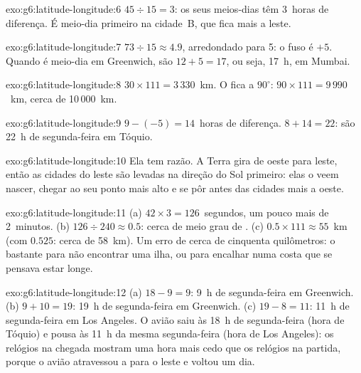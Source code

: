 \begin{solution}{exo:g6:latitude-longitude:6}
$45 \div 15 = 3$: os seus meios-dias têm 3~horas de diferença. É meio-dia
primeiro na cidade~B, que fica mais a leste.
\end{solution}

\begin{solution}{exo:g6:latitude-longitude:7}
$73 \div 15 \approx 4.9$, arredondado para 5: o fuso é $+5$. Quando é
meio-dia em Greenwich, são $12 + 5 = 17$, ou seja, 17~h, em Mumbai.
\end{solution}

\begin{solution}{exo:g6:latitude-longitude:8}
$30 \times 111 = 3\,330$~km. O  fica a $90^\circ$:
$90 \times 111 = 9\,990$~km, cerca de 10\,000~km.
\end{solution}

\begin{solution}{exo:g6:latitude-longitude:9}
$9 - (-5) = 14$~horas de diferença. $8 + 14 = 22$: são 22~h de
segunda-feira em Tóquio.
\end{solution}

\begin{solution}{exo:g6:latitude-longitude:10}
Ela tem razão. A Terra gira de oeste para leste, então as cidades do leste
são levadas na direção do Sol primeiro: elas o veem nascer, chegar ao seu
ponto mais alto e se pôr antes das cidades mais a oeste.
\end{solution}

\begin{solution}{exo:g6:latitude-longitude:11}
(a) $42 \times 3 = 126$~segundos, um pouco mais de 2~minutos. (b)
$126 \div 240 \approx 0.5$: cerca de meio grau de . (c)
$0.5 \times 111 \approx 55$~km (com $0.525$: cerca de 58~km). Um erro de
cerca de cinquenta quilômetros: o bastante para não encontrar uma ilha, ou
para encalhar numa costa que se pensava estar longe.
\end{solution}

\begin{solution}{exo:g6:latitude-longitude:12}
(a) $18 - 9 = 9$: 9~h de segunda-feira em Greenwich. (b) $9 + 10 = 19$:
19~h de segunda-feira em Greenwich. (c) $19 - 8 = 11$: 11~h de
segunda-feira em Los Angeles. O avião saiu às 18~h de segunda-feira (hora
de Tóquio) e pousa às 11~h da mesma segunda-feira (hora de Los Angeles):
os relógios na chegada mostram uma hora mais cedo que os relógios na
partida, porque o avião atravessou a  para o leste e voltou
um dia.
\end{solution}

